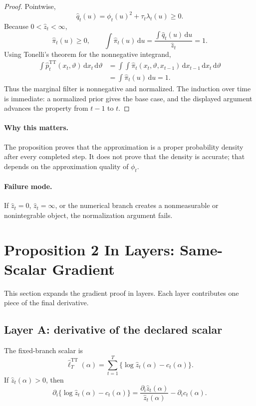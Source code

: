 \documentclass[11pt]{article}
\newcommand{\dd}{\mathrm{d}}
\newcommand{\TT}{\mathrm{TT}}
\renewcommand{\[}{\begin{equation}}
\renewcommand{\]}{\end{equation}}
\theoremstyle{definition}
\theoremstyle{remark}
\begin{document}
\begin{proof}
Pointwise,
\[
  \widehat q_t(u)=\phi_t(u)^2+\tau_t\lambda_t(u)\ge0.
\]
Because \(0<\widehat z_t<\infty\),
\[
  \widehat\pi_t(u)\ge0,\qquad
  \int\widehat\pi_t(u)\,\dd u
  =
  \frac{\int\widehat q_t(u)\,\dd u}{\widehat z_t}
  =
  1.
\]
Using Tonelli's theorem for the nonnegative integrand,
\[
\begin{aligned}
  \int \widehat p_t^{\TT}(x_t,\vartheta)\,\dd x_t\,\dd\vartheta
  &=
  \int\int
  \widehat\pi_t(x_t,\vartheta,x_{t-1})
  \,\dd x_{t-1}\,\dd x_t\,\dd\vartheta \\
  &=
  \int \widehat\pi_t(u)\,\dd u
  =
  1.
\end{aligned}
\]
Thus the marginal filter is nonnegative and normalized.  The induction over
time is immediate: a normalized prior gives the base case, and the displayed
argument advances the property from \(t-1\) to \(t\).
\end{proof}

\paragraph{Why this matters.}
The proposition proves that the approximation is a proper probability density
after every completed step.  It does not prove that the density is accurate;
that depends on the approximation quality of \(\phi_t\).

\paragraph{Failure mode.}
If \(\widehat z_t=0\), \(\widehat z_t=\infty\), or the numerical branch creates
a nonmeasurable or nonintegrable object, the normalization argument fails.

\section{Proposition 2 In Layers: Same-Scalar Gradient}

This section expands the gradient proof in layers.  Each layer contributes one
piece of the final derivative.

\subsection*{Layer A: derivative of the declared scalar}

The fixed-branch scalar is
\[
  \widehat\ell_T^{\TT}(\alpha)
  =
  \sum_{t=1}^T
  \{\log\widehat z_t(\alpha)-c_t(\alpha)\}.
  \label{eq:p14-declared-scalar}
\]
If \(\widehat z_t(\alpha)>0\), then
\[
  \partial_i
  \{\log\widehat z_t(\alpha)-c_t(\alpha)\}
  =
  \frac{\partial_i\widehat z_t(\alpha)}
       {\widehat z_t(\alpha)}
  -
  \partial_i c_t(\alpha).
  \label{eq:p14-layerA}
\]
\end{document}
